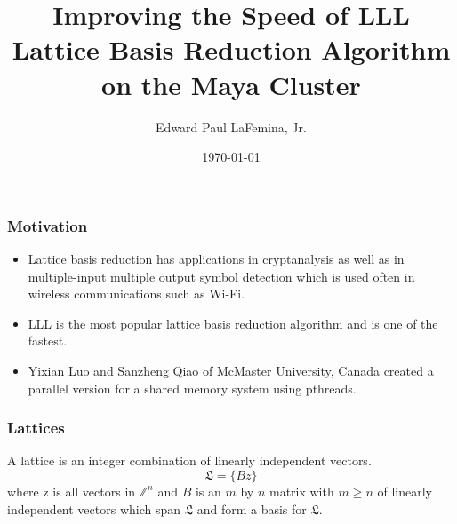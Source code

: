 \documentclass{beamer}
\title{Improving the Speed of LLL Lattice Basis Reduction Algorithm on the Maya Cluster}
\author{Edward Paul LaFemina, Jr.}
\institute{University Maryland, Baltimore County}
\date{\today}
\begin{document}
\begin{frame}
\titlepage
\end{frame}

\begin{frame}
\frametitle{Motivation}
\begin{itemize}
\item Lattice basis reduction has applications in cryptanalysis as well as in multiple-input multiple output symbol detection which is used often in wireless communications such as Wi-Fi.
\item LLL is the most popular lattice basis reduction algorithm and is one of the fastest.
\item Yixian Luo and Sanzheng Qiao of McMaster University, Canada created a parallel version for a shared memory system using pthreads.
\end{itemize}
\end{frame}

\begin{frame}
\frametitle{Lattices}
\begin{definition}
A lattice is an integer combination of linearly independent vectors.
$$\mathfrak{L} = \{Bz\}$$
where z is all vectors in $\mathbb{Z}^n$ and $B$ is an $m$ by $n$ matrix with $m\geq n$ of linearly independent vectors which span $\mathfrak{L}$ and form a basis for $\mathfrak{L}$.
\end{definition}
\end{frame}
\end{document}
